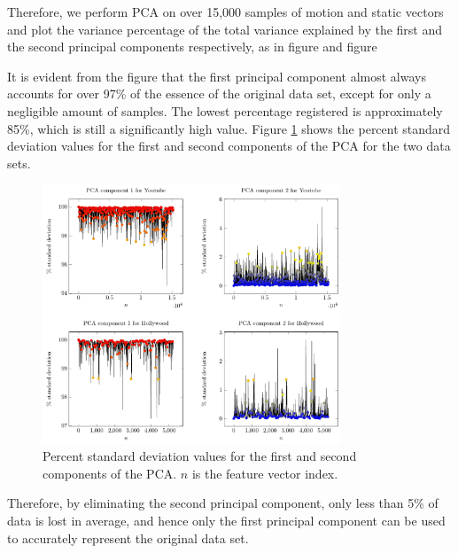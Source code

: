 Therefore, we perform PCA on over 15,000 samples of motion and static
vectors and plot the variance percentage of the total variance
explained by the first and the second principal components respectively, as in figure and figure


It is evident from the figure that the first principal component almost always accounts
for over 97\% of the essence of the original data set, except for only a negligible amount
of samples. The lowest percentage registered is approximately 85\%, which is still a
significantly high value. Figure \ref{fi:pca} shows the percent standard deviation values for the first and second components of the PCA for the two data sets.

\begin{figure}
  \centering
  \includegraphics[width=3.5in]{figures/pca.pdf}
  \caption{Percent standard deviation values for the first and second components of the PCA. $n$ is the feature vector index. }\label{fi:pca}
\end{figure}


Therefore, by eliminating the second principal component, only less than 5\% of data
is lost in average, and hence only the first principal component can be used to accurately
represent the original data set.    